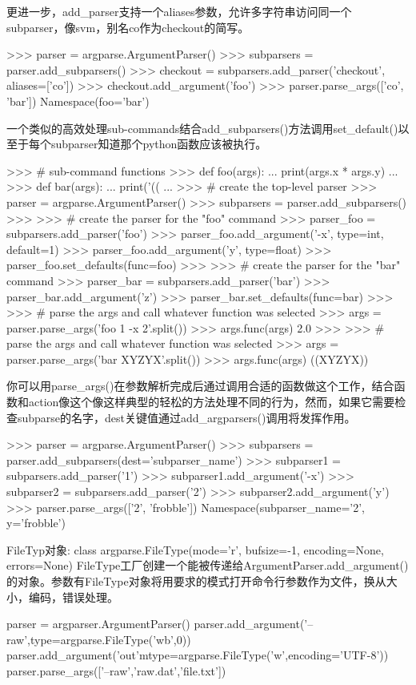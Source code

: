 更进一步，add\_parser支持一个aliases参数，允许多字符串访问同一个subparser，像svm，别名co作为checkout的简写。
\begin{python}
>>> parser = argparse.ArgumentParser()
>>> subparsers = parser.add_subparsers()
>>> checkout = subparsers.add_parser('checkout', aliases=['co'])
>>> checkout.add_argument('foo')
>>> parser.parse_args(['co', 'bar'])
Namespace(foo='bar')
\end{python}
一个类似的高效处理sub-commands结合add\_subparsers()方法调用set\_default()以至于每个subparser知道那个python函数应该被执行。
\begin{python}
>>> # sub-command functions
>>> def foo(args):
...     print(args.x * args.y)
...
>>> def bar(args):
...     print('((%
...
>>> # create the top-level parser
>>> parser = argparse.ArgumentParser()
>>> subparsers = parser.add_subparsers()
>>>
>>> # create the parser for the "foo" command
>>> parser_foo = subparsers.add_parser('foo')
>>> parser_foo.add_argument('-x', type=int, default=1)
>>> parser_foo.add_argument('y', type=float)
>>> parser_foo.set_defaults(func=foo)
>>>
>>> # create the parser for the "bar" command
>>> parser_bar = subparsers.add_parser('bar')
>>> parser_bar.add_argument('z')
>>> parser_bar.set_defaults(func=bar)
>>>
>>> # parse the args and call whatever function was selected
>>> args = parser.parse_args('foo 1 -x 2'.split())
>>> args.func(args)
2.0
>>>
>>> # parse the args and call whatever function was selected
>>> args = parser.parse_args('bar XYZYX'.split())
>>> args.func(args)
((XYZYX))
\end{python}
你可以用parse\_args()在参数解析完成后通过调用合适的函数做这个工作，结合函数和action像这个像这样典型的轻松的方法处理不同的行为，然而，如果它需要检查subparse的名字，dest关键值通过add\_argparsers()调用将发挥作用。
\begin{python}
>>> parser = argparse.ArgumentParser()
>>> subparsers = parser.add_subparsers(dest='subparser_name')
>>> subparser1 = subparsers.add_parser('1')
>>> subparser1.add_argument('-x')
>>> subparser2 = subparsers.add_parser('2')
>>> subparser2.add_argument('y')
>>> parser.parse_args(['2', 'frobble'])
Namespace(subparser_name='2', y='frobble')
\end{python}
FileTyp对象:\newline
class argparse.FileType(mode='r', bufsize=-1, encoding=None, errors=None)
FileType工厂创建一个能被传递给ArgumentParser.add\_argument()的对象。参数有FileType对象将用要求的模式打开命令行参数作为文件，换从大小，编码，错误处理。
\begin{python}
parser = argparser.ArgumentParser()
parser.add_argument('--raw',type=argparse.FileType('wb',0))
parser.add_argument('out'mtype=argparse.FileType('w',encoding='UTF-8'))
parser.parse_args(['--raw','raw.dat','file.txt'])
\end{python}
